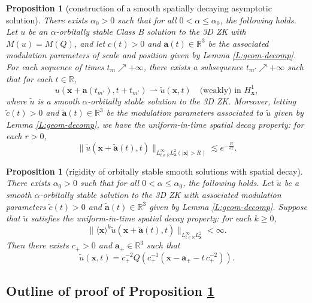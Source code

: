 \documentclass[12pt,letterpaper]{amsart}
\newcommand{\la}{\langle}
\newcommand{\ra}{\rangle}
\newtheorem{proposition}[theorem]{Proposition}
\theoremstyle{remark}
\numberwithin{equation}{section}
\numberwithin{theorem}{section}
\numberwithin{table}{section}
\begin{document}
\begin{proposition}[construction of a smooth spatially decaying asymptotic solution]
\label{P:wk-lim}
There exists $\alpha_0>0$ such that for all $0< \alpha \leq \alpha_0$, the following holds.  Let $u$ be an $\alpha$-orbitally stable Class B solution to the 3D ZK with $M(u)=M(Q)$, and let $c(t)>0$ and $\mathbf{a}(t) \in \mathbb{R}^3$ be the associated modulation parameters of scale and position given by Lemma \ref{L:geom-decomp}.  For each sequence of times $t_m \nearrow +\infty$, there exists a subsequence $t_{m'} \nearrow +\infty$ such that for each $t\in \mathbb{R}$, 
$$
u(\mathbf{x} + \mathbf{a}(t_{m'}), t+ t_{m'}) \rightharpoonup \tilde u(\mathbf{x}, t) \quad \text{(weakly) in }H_{\mathbf{x}}^1,
$$
where $\tilde u$ is a \emph{smooth} $\alpha$-orbitally stable solution to the 3D ZK.  Moreover, letting  $\tilde c(t)>0$ and $\tilde{\mathbf{a}}(t)\in \mathbb{R}^3$ be the modulation parameters associated to $\tilde u$ given by Lemma \ref{L:geom-decomp}, we have the uniform-in-time spatial decay property:  for each  $r>0$, 
$$
\| \tilde u( \mathbf{x} + \tilde{\mathbf{a}}(t), t) \|_{L_{t\in \mathbb{R}}^\infty L^2_{\mathbf{x}}(|\mathbf{x}|>R)} \lesssim e^{- \frac{R}{32}}.
$$
\end{proposition}

\begin{proposition}[rigidity of orbitally stable smooth solutions with spatial decay]
\label{P:rigidity}
There exists $\alpha_0>0$ such that for all $0< \alpha \leq \alpha_0$, the following holds.  Let $\tilde u$ be a smooth $\alpha$-orbitally stable solution to the 3D ZK with associated modulation parameters $\tilde c(t)>0$ and $\tilde{\mathbf{a}}(t)\in \mathbb{R}^3$ given by Lemma \ref{L:geom-decomp}.  Suppose that $\tilde u$ satisfies the uniform-in-time spatial decay property:  for each $k\geq 0$, 
\begin{equation}
\label{E:intro-101}
\| \la  \mathbf{x}  \ra^k \tilde u( \mathbf{x} + \tilde{\mathbf{a}}(t), t) \|_{L_{t\in \mathbb{R}}^\infty L^2_{\mathbf{x}}} < \infty.
\end{equation}
Then there exists $c_+>0$ and $\mathbf{a}_+\in \mathbb{R}^3$ such that
$$
\tilde u( \mathbf{x}, t) = c_+^{-2} Q\left( c_+^{-1}(\mathbf{x} - \mathbf{a}_+- t\,c_+^{-2})\right).
$$
\end{proposition}

\subsection{Outline of proof of Proposition \ref{P:wk-lim}}
\end{document}
